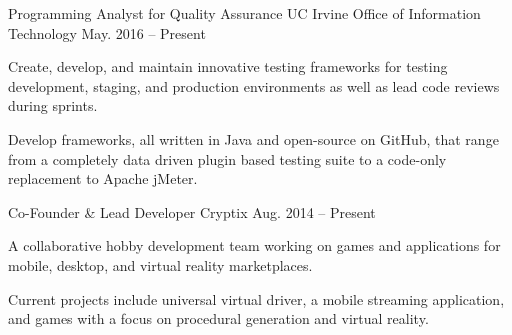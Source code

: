 

\begin{cventries}

  \cventry%
    {Programming Analyst for Quality Assurance} %
    {UC Irvine Office of Information Technology} %
    {} %
    {May. 2016 -- Present} %
    {
      \begin{cvitems} %
        \item {Create, develop, and maintain innovative testing frameworks %
        for testing development, staging, and production environments as well %
        as lead code reviews during sprints.}
        \item {Develop frameworks, all written in Java and open-source on GitHub, %
        that range from a completely data driven plugin based testing suite to a %
        code-only replacement to Apache jMeter.}
      \end{cvitems}
    }

  \cventry%
    {Co-Founder \& Lead Developer} %
    {Cryptix} %
    {} %
    {Aug. 2014 -- Present} %
    {
      \begin{cvitems} %
        \item {A collaborative hobby development team working on games and %
        applications for mobile, desktop, and virtual reality marketplaces.}
        \item {Current projects include universal virtual driver, a mobile %
        streaming application, and games with a focus on procedural generation %
        and virtual reality.}
      \end{cvitems}
    }


\end{cventries}
